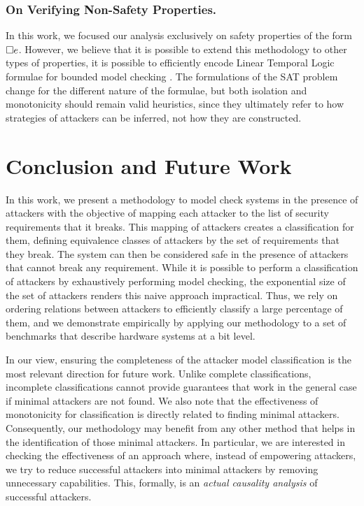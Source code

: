 {\subsubsection{On Verifying Non-Safety Properties.} In this work, we focused our analysis exclusively on safety properties of the form ${{\square}} e$. However, we believe that it is possible to extend this methodology to other types of properties, it is possible to efficiently encode Linear Temporal Logic formulae for bounded model checking \cite{BMCWithoutBDDs,lmcs:2236}. The formulations of the SAT problem change for the different nature of the formulae, but both isolation and monotonicity should remain valid heuristics, since they ultimately refer to how strategies of attackers can be inferred, not how they are constructed.  

\section{Conclusion and Future Work}
\label{sec:conclusion}
In this work, we present a methodology to model check systems in the presence of attackers with the objective of mapping each attacker to the list of security requirements that it breaks. This mapping of attackers creates a classification for them, defining equivalence classes of attackers by the set of requirements that they break. The system can then be considered safe in the presence of attackers that cannot break any requirement. While it is possible to perform a classification of attackers by exhaustively performing model checking, the exponential size of the set of attackers renders this naive approach impractical. Thus, we rely on ordering relations between attackers to efficiently classify a large percentage of them, and we demonstrate empirically by applying our methodology to a set of benchmarks that describe hardware systems at a bit level.

In our view, ensuring the completeness of the attacker model classification is the most relevant direction for future work. Unlike complete classifications, incomplete classifications cannot provide guarantees that work in the general case if minimal attackers are not found. We also note that the effectiveness of monotonicity for classification is directly related to finding minimal attackers. Consequently, our methodology may benefit from any other method that helps in the identification of those minimal attackers. In particular, we are interested in checking the effectiveness of an approach where, instead of empowering attackers, we try to {reduce} successful attackers into minimal attackers by removing unnecessary capabilities. This, formally, is an \emph{actual causality analysis} \cite{ActualCausality} of successful attackers.
}
